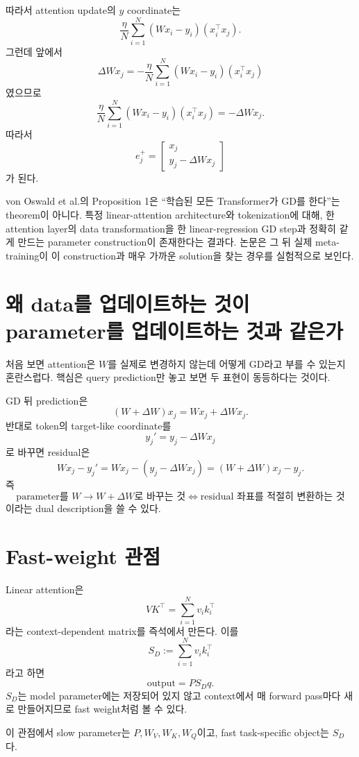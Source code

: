 \documentclass[11pt,a4paper,oneside,openany]{memoir}
\theoremstyle{definition}
\begin{document}
따라서 attention update의 $y$ coordinate는
\[
\frac\eta N\sum_{i=1}^N(Wx_i-y_i)(x_i^\top x_j).
\]
그런데 앞에서
\[
\Delta W x_j
=-\frac\eta N\sum_{i=1}^N(Wx_i-y_i)(x_i^\top x_j)
\]
였으므로
\[
\frac\eta N\sum_{i=1}^N(Wx_i-y_i)(x_i^\top x_j)
=-\Delta W x_j.
\]
따라서
\[
\boxed{
e_j^+
=
\begin{bmatrix}
x_j\\y_j-\Delta W x_j
\end{bmatrix}}
\]
가 된다.

\begin{paperbox}
von Oswald et al.의 Proposition 1은 ``학습된 모든 Transformer가 GD를 한다''는 theorem이 아니다. 특정 linear-attention architecture와 tokenization에 대해, 한 attention layer의 data transformation을 한 linear-regression GD step과 정확히 같게 만드는 parameter construction이 존재한다는 결과다. 논문은 그 뒤 실제 meta-training이 이 construction과 매우 가까운 solution을 찾는 경우를 실험적으로 보인다.
\end{paperbox}

\section{왜 data를 업데이트하는 것이 parameter를 업데이트하는 것과 같은가}

처음 보면 attention은 $W$를 실제로 변경하지 않는데 어떻게 GD라고 부를 수 있는지 혼란스럽다.
핵심은 query prediction만 놓고 보면 두 표현이 동등하다는 것이다.

GD 뒤 prediction은
\[
(W+\Delta W)x_j
=Wx_j+\Delta W x_j.
\]
반대로 token의 target-like coordinate를
\[
y_j' = y_j-\Delta W x_j
\]
로 바꾸면 residual은
\[
Wx_j-y_j'
=Wx_j-(y_j-\Delta W x_j)
=(W+\Delta W)x_j-y_j.
\]
즉
\[
\boxed{
\text{parameter를 }W\to W+\Delta W\text{로 바꾸는 것}
\Longleftrightarrow
\text{residual 좌표를 적절히 변환하는 것}
}
\]
이라는 dual description을 쓸 수 있다.

\section{Fast-weight 관점}

Linear attention은
\[
VK^\top
=\sum_{i=1}^Nv_i k_i^\top
\]
라는 context-dependent matrix를 즉석에서 만든다.
이를
\[
S_D:=\sum_{i=1}^Nv_i k_i^\top
\]
라고 하면
\[
\text{output}=PS_Dq.
\]
$S_D$는 model parameter에는 저장되어 있지 않고 context에서 매 forward pass마다 새로 만들어지므로 fast weight처럼 볼 수 있다.

이 관점에서 slow parameter는 $P,W_V,W_K,W_Q$이고, fast task-specific object는 $S_D$다.
\end{document}
